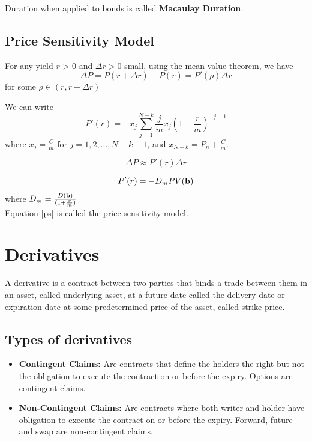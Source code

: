 \documentclass{report}
\begin{document}
Duration when applied to bonds is called {\bf Macaulay Duration}.


\subsection{Price Sensitivity Model}
For any yield $r$ > 0 and $\Delta r > 0$ small, using the mean value theorem, we have
\begin{equation}
    \Delta P = P(r+\Delta r)-P(r) = P'(\rho)\Delta r
\end{equation}
for some $\rho \in (r, r+\Delta r)$


We can write 
\begin{equation}
    P'(r) = -x_j\sum_{j=1}^{N-k}\frac{j}{m}x_j(1+\frac{r}{m})^{-j-1}
\end{equation}
where $x_j = \frac{C}{m}$ for $j = 1, 2, \dots, N-k-1$, and $x_{N-k} = P_n + \frac{C}{m}$.


\begin{equation}
    \Delta P \approx P'(r)\Delta r
\end{equation}

\begin{equation}
\label{ps}
    P'(r) = -D_mPV({\bf b})
\end{equation}
where $D_m = \frac{D({\bf b})}{(1+\frac{r}{m})}$\\

Equation \ref{ps} is called the price sensitivity model.


\section{Derivatives}
A derivative is a contract between two parties that binds a trade between them in an asset, called underlying asset, at a future date called the delivery date or expiration date at some predetermined price of the asset, called strike price.


\subsection{Types of derivatives}
\begin{itemize}
    \item {\bf Contingent Claims:} Are contracts that define the holders the right but not the obligation to execute the contract on or before the expiry. Options are contingent claims.
    \item {\bf Non-Contingent Claims:} Are contracts where both writer and holder have obligation to execute the contract on or before the expiry. Forward, future and swap are non-contingent claims.
\end{itemize}
\end{document}
